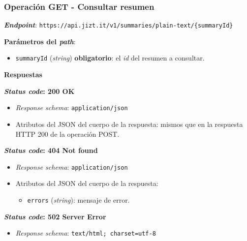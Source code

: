 \vspace{0.5cm}
\subsubsection{Operación GET - Consultar resumen}

\textbf{\emph{Endpoint}}: \texttt{https://api.jizt.it/v1/summaries/plain-text/\{summaryId\}}

\textbf{Parámetros del \emph{path}}: 
\vspace{-0.3cm}
\begin{itemize} [\textbullet]
	\item \texttt{summaryId} (\emph{string}) \textbf{obligatorio}: el \emph{id} del resumen a consultar.
\end{itemize}	
	
	
\textbf{Respuestas}

\textbf{\emph{Status code}: 200 OK}

\vspace{-0.3cm}
\begin{itemize} [\textbullet]
	\item \emph{Response schema}: \texttt{application/json}
	\item Atributos del JSON del cuerpo de la respuesta: mismos que en la respuesta HTTP 200 de la operación POST.
\end{itemize}

\textbf{\emph{Status code}: 404 Not found}
\vspace{-0.3cm}
\begin{itemize} [\textbullet]
	\item \emph{Response schema}: \texttt{application/json}
	
	\item Atributos del JSON del cuerpo de la respuesta:
	\begin{itemize} [◦]
		\item \texttt{errors} (\emph{string}): mensaje de error.
	\end{itemize}
\end{itemize}

\textbf{\emph{Status code}: 502 Server Error}

\vspace{-0.3cm}
\begin{itemize} [\textbullet]
	\item \emph{Response schema}: \texttt{text/html; charset=utf-8}
\end{itemize}

\vspace{0.5cm}
